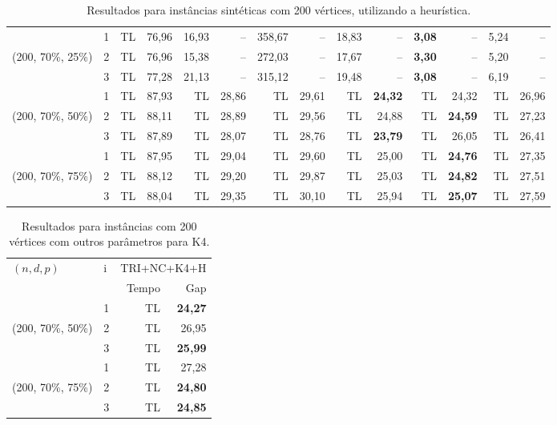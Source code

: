 \documentclass[
12pt,notheorems,hyperref={pdfauthor=whatever}
]{beamer}
\begin{document}
\begin{frame}
\begin{table}[h]
\begin{tabular}{l|l|rr|rr|rr|rr|rr|rr}
\hline
& 1 & TL & 76,96 & 16,93 & -- & 358,67 & -- & 18,83 & -- & \textbf{3,08} & -- & 5,24 & -- \\
(200, 70\%, 25\%) & 2 & TL & 76,96 & 15,38 & -- & 272,03 & -- & 17,67 & -- & \textbf{3,30} & -- & 5,20 & -- \\
& 3 & TL & 77,28 & 21,13 & -- & 315,12 & -- & 19,48 & -- & \textbf{3,08} & -- & 6,19 & -- \\
\hline
& 1 & TL & 87,93 & TL & 28,86 & TL & 29,61 & TL & \textbf{24,32} & TL & 24,32 & TL & 26,96 \\
(200, 70\%, 50\%) & 2 & TL & 88,11 & TL & 28,89 & TL & 29,56 & TL & 24,88 & TL & \textbf{24,59} & TL & 27,23 \\
& 3 & TL & 87,89 & TL & 28,07 & TL & 28,76 & TL & \textbf{23,79} & TL & 26,05 & TL & 26,41 \\
\hline
& 1 & TL & 87,95 & TL & 29,04 & TL & 29,60 & TL & 25,00 & TL & \textbf{24,76} & TL & 27,35 \\
(200, 70\%, 75\%) & 2 & TL & 88,12 & TL & 29,20 & TL & 29,87 & TL & 25,03 & TL & \textbf{24,82} & TL & 27,51 \\
& 3 & TL & 88,04 & TL & 29,35 & TL & 30,10 & TL & 25,94 & TL & \textbf{25,07} & TL & 27,59 \\
\hline
\end{tabular}
\caption{Resultados para instâncias sintéticas com 200 vértices, utilizando a heurística.}
\end{table}    
\end{frame}

\begin{frame}
    \begin{table}[h]
    \label{tab:sint-200.2}
    \centering
    \begin{tabular}{l|l|rr}
        \hline
        \multirow{2}{*}{$(n,d,p)$} & \multirow{2}{*}{i} & \multicolumn{2}{c}{TRI+NC+K4+H} \\
        &  & Tempo & Gap \\
        \hline
        & 1 & TL & \textbf{24,27} \\
        (200, 70\%, 50\%) & 2 & TL & 26,95 \\
        & 3 & TL & \textbf{25,99} \\
        \hline
        & 1 & TL & 27,28 \\
        (200, 70\%, 75\%) & 2 & TL & \textbf{24,80} \\
        & 3 & TL & \textbf{24,85} \\
        \hline
    \end{tabular}
    \caption{Resultados para instâncias com 200 vértices com outros parâmetros para K4.}
    \end{table}
\end{frame}
\end{document}
